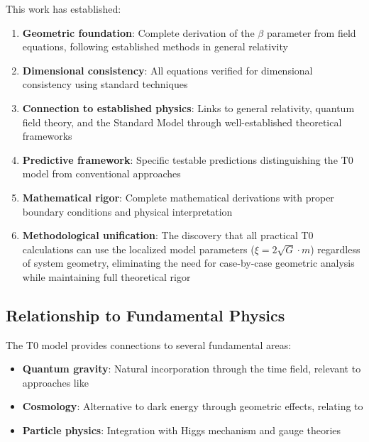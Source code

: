 \documentclass[12pt,a4paper]{article}
\begin{document}
	This work has established:
	\begin{enumerate}
		\item \textbf{Geometric foundation}: Complete derivation of the $\beta$ parameter from field equations, following established methods in general relativity \citep{misner1973,carroll2004}
		
		\item \textbf{Dimensional consistency}: All equations verified for dimensional consistency using standard techniques \citep{barenblatt1996}
		
		\item \textbf{Connection to established physics}: Links to general relativity, quantum field theory, and the Standard Model through well-established theoretical frameworks
		
		\item \textbf{Predictive framework}: Specific testable predictions distinguishing the T0 model from conventional approaches
		
		\item \textbf{Mathematical rigor}: Complete mathematical derivations with proper boundary conditions and physical interpretation
		
		\item \textbf{Methodological unification}: The discovery that all practical T0 calculations can use the localized model parameters ($\xi = 2\sqrt{G} \cdot m$) regardless of system geometry, eliminating the need for case-by-case geometric analysis while maintaining full theoretical rigor
	\end{enumerate}
	
	\subsection{Relationship to Fundamental Physics}
	\label{subsec:fundamental_physics}
	
	The T0 model provides connections to several fundamental areas:
	\begin{itemize}
		\item \textbf{Quantum gravity}: Natural incorporation through the time field, relevant to approaches like \citep{thiemann2007,rovelli2004}
		\item \textbf{Cosmology}: Alternative to dark energy through geometric effects, relating to \citep{weinberg2008,peebles1993}
		\item \textbf{Particle physics}: Integration with Higgs mechanism and gauge theories \citep{weinberg2003,peskin1995}
	\end{itemize}
	
\end{document}
